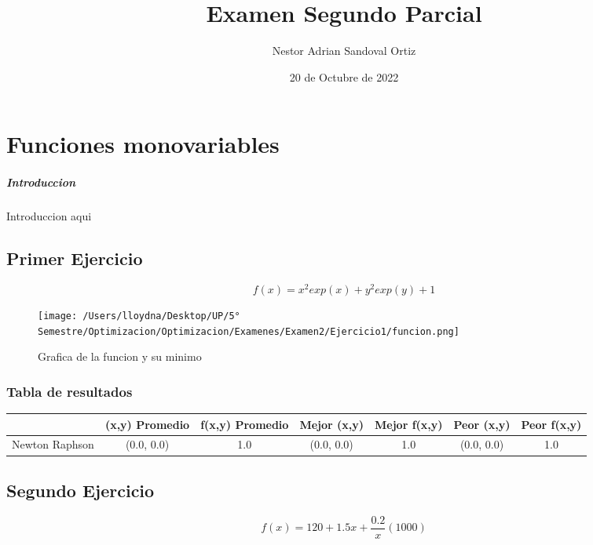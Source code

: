 \documentclass{report}
\title{Examen Segundo Parcial}
\date{20 de Octubre de 2022}
\author{Nestor Adrian Sandoval Ortiz}
\begin{document}
    \maketitle
    \chapter{Funciones monovariables}
        \paragraph{Introduccion}
        Introduccion aqui

        \pagebreak

        \section{Primer Ejercicio}
            \begin{equation*}
                f(x)=x^2exp(x)+y^2exp(y)+1 
            \end{equation*}

            \begin{figure}[H]
                \texttt{[image: /Users/lloydna/Desktop/UP/5° Semestre/Optimizacion/Optimizacion/Examenes/Examen2/Ejercicio1/funcion.png]}
                \caption{Grafica de la funcion y su minimo}
                \label{fig:fun11}
            \end{figure}

            \subsection{Tabla de resultados}
                \begin{tabular}{l|c|c|c|c|c|c}
                    & (x,y) Promedio & f(x,y) Promedio & Mejor (x,y) & Mejor f(x,y) & Peor (x,y) & Peor f(x,y)\\
                    \hline
                    Newton Raphson & (0.0, 0.0) & 1.0 & (0.0, 0.0) & 1.0 & (0.0, 0.0) & 1.0\\
                    \hline
                \end{tabular}
        \pagebreak

        \section{Segundo Ejercicio}
            \begin{equation*}
                f(x)=120+1.5x+\frac{0.2}{x}(1000) 
            \end{equation*}
\end{document}
